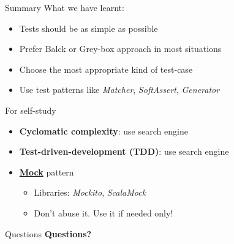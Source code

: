 \documentclass[aspectratio=169]{beamer}
\begin{document}
\begin{frame}{Summary}
  What we have learnt:
  \begin{itemize}
    \item Tests should be as simple as possible
    \item Prefer Balck or Grey-box approach in most situations
    \item Choose the most appropriate kind of test-case
    \item Use test patterns like \textit{Matcher}, \textit{SoftAssert}, \textit{Generator}
  \end{itemize}
\end{frame}

\begin{frame}{For self-study}
  \begin{itemize}
    \item \textbf{Cyclomatic complexity}: use search engine
    \item \textbf{Test-driven-development (TDD)}: use search engine
    \item \textbf{\underline{Mock}} pattern
      \begin{itemize}
        \item Libraries: \textit{Mockito}, \textit{ScalaMock}
        \item Don't abuse it. Use it if needed only!
      \end{itemize}
  \end{itemize}
\end{frame}

\begin{frame}{Questions}
  \centering\Large \textbf{Questions?}
\end{frame}
\end{document}
